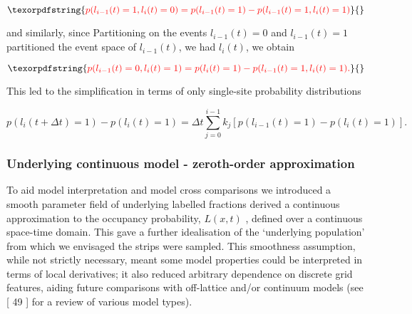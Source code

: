 \documentclass[10pt,letterpaper]{article}
\providecommand{\DIFaddtex}[1]{{\protect\color{blue} \sf #1}} %
\providecommand{\DIFdeltex}[1]{{\protect\color{red} \scriptsize #1}} %
\providecommand{\DIFaddbegin}{} %
\providecommand{\DIFaddend}{} %
\providecommand{\DIFdelbegin}{} %
\providecommand{\DIFdelend}{} %
\providecommand{\DIFadd}[1]{\texorpdfstring{\DIFaddtex{#1}}{#1}} %
\providecommand{\DIFdel}[1]{\texorpdfstring{\DIFdeltex{#1}}{}} %
\begin{document}
\begin{displaymath}\DIFdel{p(l_{i-1}(t) = 1,l_i(t)=0) = p(l_{i-1}(t)=1) - p(l_{i-1}(t) = 1,l_i(t)=1)%
}\end{displaymath}

\DIFdel{and similarly, since }\DIFdelend \DIFaddbegin \DIFadd{Partitioning on the events
}\DIFaddend \(l_{i-1}(t)=0\) and \DIFdelbegin \DIFdel{\(l_{i-1}(t)=1\) partitioned
the event space of \(l_{i-1}(t)\), we had
}\DIFdelend \DIFaddbegin \DIFadd{\(l_i(t)\), we obtain
}\DIFaddend 

\DIFdelbegin \begin{displaymath}\DIFdel{p(l_{i-1}(t) = 0,l_i(t)=1) = p(l_{i}(t)=1) - p(l_{i-1}(t) = 1,l_i(t)=1). %
}\end{displaymath}

\DIFdel{This led to the simplification in terms of only single-site probability
distributions
}%

\DIFdelend \begin{equation}p(l_i(t+\Delta t)=1) - p(l_i(t)=1) = \Delta t\sum_{j=0}^{i-1}k_j\left[p(l_{i-1}(t)=1)-p(l_i(t)=1)\right]. \label{eq:label-master-discrete-cons}\end{equation}

\subsubsection{Underlying continuous model - zeroth-order
approximation}\label{underlying-continuous-model---zeroth-order-approximation}

To aid model interpretation and model cross comparisons we \DIFdelbegin \DIFdel{introduced a
smooth parameter field of underlying labelled fractions }\DIFdelend \DIFaddbegin \DIFadd{derived a
continuous approximation to the occupancy probability, }\DIFaddend \(L(x,t)\)\DIFdelbegin \DIFdel{,
defined over a continuous space-time domain}\DIFdelend . This
gave a further idealisation of the `underlying population' from which we
envisaged the strips were sampled. This smoothness assumption, while not
strictly necessary, meant some model properties could be interpreted in
terms of local derivatives; it also reduced arbitrary dependence on
discrete grid features, aiding future comparisons with off-lattice
and/or continuum models \DIFdelbegin \DIFdel{(see }\DIFdelend {[}\DIFdelbegin \DIFdel{49}\DIFdelend \DIFaddbegin \DIFadd{44}\DIFaddend {]}\DIFdelbegin \DIFdel{for a review of various model types)}\DIFdelend .
\end{document}
